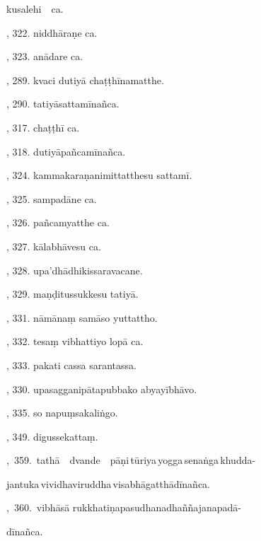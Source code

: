 \hspace{15mm} kusalehi\ \ ca.\hfill \pageref{sut:303}\par {}, 322. niddhāraṇe ca.\hfill \pageref{sut:304}\par {}, 323. anādare ca.\hfill \pageref{sut:305}\par {}, 289. kvaci dutiyā chaṭṭhīnamatthe.\hfill \pageref{sut:306}\par {}, 290. tatiyāsattamīnañca.\hfill \pageref{sut:307}\par {}, 317. chaṭṭhī ca.\hfill \pageref{sut:308}\par {}, 318. dutiyāpañcamīnañca.\hfill \pageref{sut:309}\par {}, 324. kammakaraṇanimittatthesu sattamī.\hfill \pageref{sut:310}\par {}, 325. sampadāne ca.\hfill \pageref{sut:311}\par {}, 326. pañcamyatthe ca.\hfill \pageref{sut:312}\par {}, 327. kālabhāvesu ca.\hfill \pageref{sut:313}\par {}, 328. upa’dhādhikissaravacane.\hfill \pageref{sut:314}\par {}, 329. maṇḍitussukkesu tatiyā.\hfill \pageref{sut:315}\par {}, 331. nāmānaṃ samāso yuttattho.\hfill \pageref{sut:316}\par {}, 332. tesaṃ vibhattiyo lopā ca.\hfill \pageref{sut:317}\par {}, 333. pakati cassa sarantassa.\hfill \pageref{sut:318}\par {}, 330. upasagganipātapubbako abyayībhāvo.\hfill \pageref{sut:319}\par {}, 335. so napuṃsakaliṅgo.\hfill \pageref{sut:320}\par {}, 349. digussekattaṃ.\hfill \pageref{sut:321}\par {},~359.~tathā\ \ dvande\ \ pāṇi\,tūriya\,yogga\,senaṅga\,khudda-\par \noindent
\hspace{15mm} jantuka\,vividhaviruddha\,visabhāgatthādīnañca.\hfill \pageref{sut:322}\par {},~360.~vibhāsā rukkhatiṇapasudhanadhaññajanapadā-\par \noindent
\hspace{15mm} dīnañca.\hfill \pageref{sut:323}\par \noindent
